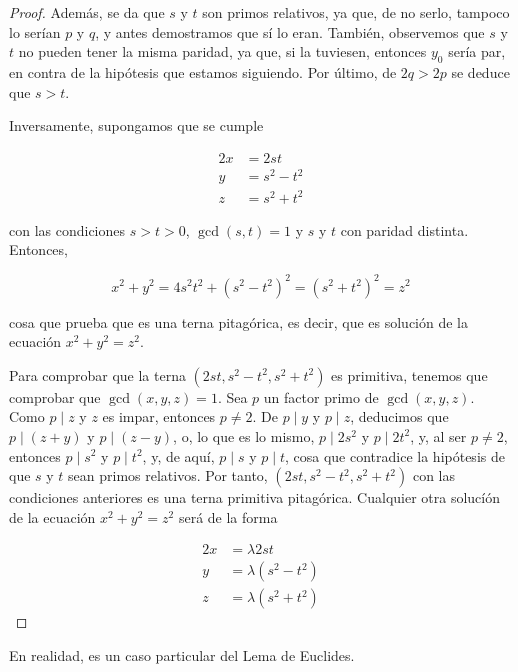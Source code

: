 \begin{proof}
  Además, se da que $s$ y $t$ son primos relativos, ya que, de no serlo,
  tampoco lo serían $p$ y $q$, y antes demostramos que sí lo eran. También,
  observemos que $s$ y $t$ no pueden tener la misma paridad, ya que, si la
  tuviesen, entonces $y_0$ sería par, en contra de la hipótesis que estamos
  siguiendo. Por último, de $2q > 2p$ se deduce que $s > t$.

  Inversamente, supongamos que se cumple

  \begin{alignat*}{2}
    x   &= 2st \\
    y   &= s^2 - t^2 \\
    z   &= s^2 + t^2
  \end{alignat*}

  \noindent con las condiciones $s > t > 0$, $\gcd(s, t) = 1$ y $s$ y $t$
  con paridad distinta. Entonces,

  $$ x^2 + y^2 = 4s^2 t^2 + (s^2 - t^2)^2 = (s^2 + t^2)^2 = z^2 $$

  \noindent cosa que prueba que es una terna pitagórica, es decir, que es
  solución de la ecuación $x^2 + y^2 = z^2$.

  Para comprobar que la terna $(2st, s^2 - t^2, s^2 + t^2)$ es primitiva,
  tenemos que comprobar que $\gcd(x, y, z) = 1$. Sea $p$ un factor primo de
  $\gcd(x, y, z)$. Como $p \mid z$ y $z$ es impar, entonces $p \neq 2$. De
  $p \mid y$ y $p \mid z$, deducimos que $p \mid (z + y)$ y $p \mid (z -
  y)$, o, lo que es lo mismo, $p \mid 2s^2$ y $p \mid 2t^2$, y, al ser $p
  \neq 2$, entonces $p \mid s^2$ y $p \mid t^2$, y, de aquí, $p \mid s$ y
  $p \mid t$, cosa que contradice la hipótesis de que $s$ y $t$ sean primos
  relativos. Por tanto, $(2st,  s^2 - t^2, s^2 + t^2)$ con las condiciones
  anteriores es una terna primitiva pitagórica. Cualquier otra solucíón de
  la ecuación $x^2 + y^2 = z^2$ será de la forma

  \begin{alignat*}{2}
    x &= \lambda 2st \\
    y &= \lambda(s^2 - t^2) \\
    z &= \lambda(s^2 + t^2)
  \end{alignat*}
\end{proof}
\fi








\iffalse En realidad, es un caso particular del Lema de Euclides.

